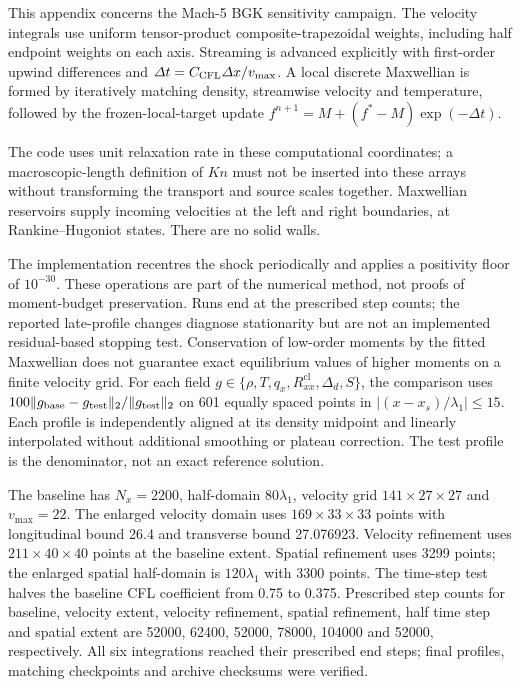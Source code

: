 \documentclass[lineno,paper]{JFM-FLM_Au}
\newenvironment{revision}{\begingroup\colorlet{shadecolor}{revisionyellow}\begin{shaded}}{\end{shaded}\endgroup}
\newenvironment{revision}{}{}
\newcommand{\Kn}{\mathit{Kn}}
\newcommand{\cl}{\mathrm{cl}}
\begin{document}
\begin{revision}
This appendix concerns the Mach-5 BGK sensitivity campaign. 
The velocity integrals use uniform tensor-product composite-trapezoidal weights, including half endpoint weights on each axis. Streaming is advanced explicitly with first-order upwind differences and $\Delta t=C_{\rm CFL}\Delta x/v_{\max}$. A local discrete Maxwellian is formed by iteratively matching density, streamwise velocity and temperature, followed by the frozen-local-target update $f^{n+1}=M+(f^*-M)\exp(-\Delta t)$. 

The code uses unit relaxation rate in these computational coordinates; a macroscopic-length definition of $\Kn$ must not be inserted into these arrays without transforming the transport and source scales together. Maxwellian reservoirs supply incoming velocities at the left and right boundaries, at Rankine--Hugoniot states. There are no solid walls. 

The implementation recentres the shock periodically and applies a positivity floor of $10^{-30}$. These operations are part of the numerical method, not proofs of moment-budget preservation. Runs end at the prescribed step counts; the reported late-profile changes diagnose stationarity but are not an implemented residual-based stopping test. Conservation of low-order moments by the fitted Maxwellian does not guarantee exact equilibrium values of higher moments on a finite velocity grid.
For each field $g\in\{\rho,T,q_x,R^{\cl}_{xx},\Delta_d,S\}$, the comparison uses $100\|g_{\rm base}-g_{\rm test}\|_2/\|g_{\rm test}\|_2$ on 601 equally spaced points in $|(x-x_s)/\lambda_1|\leq15$. Each profile is independently aligned at its density midpoint and linearly interpolated without additional smoothing or plateau correction. The test profile is the denominator, not an exact reference solution. 

The baseline has $N_x=2200$, half-domain $80\lambda_1$, velocity grid $141\times27\times27$ and $v_{\max}=22$. The enlarged velocity domain uses $169\times33\times33$ points with longitudinal bound 26.4 and transverse bound 27.076923. Velocity refinement uses $211\times40\times40$ points at the baseline extent. Spatial refinement uses 3299 points; the enlarged spatial half-domain is $120\lambda_1$ with 3300 points. The time-step test halves the baseline CFL coefficient from 0.75 to 0.375. Prescribed step counts for baseline, velocity extent, velocity refinement, spatial refinement, half time step and spatial extent are 52000, 62400, 52000, 78000, 104000 and 52000, respectively. All six integrations reached their prescribed end steps; final profiles, matching checkpoints and archive checksums were verified.
\end{revision}
\end{document}

